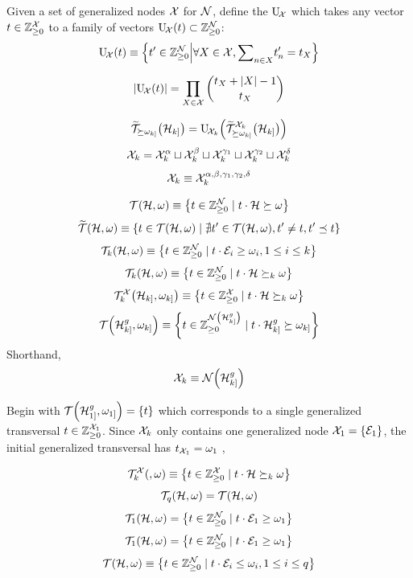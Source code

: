 \documentclass[aps, 10pt, english, twoside, twocolumn, pra, nofootinbib, tightenlines, longbibliography, superscriptaddress]{revtex4-1}
\begin{document}
    \begin{definition}
        Given a set of generalized nodes $\mathcal{X}$ for $\mathcal{N}$, define the  $\mathrm{U}_{\!\mathcal{X}}$ which takes any vector $t \in {\mathbb{Z}}_{\geq 0}^{\mathcal{X}}$ to a family of vectors $\mathrm{U}_{\!\s X}\br{t} \subset \Z_{\geq 0}^{\s N}$:
        \[ \mathrm{U}_{\!\s X}\br{t} \defined \bcm{t' \in \Z_{\geq 0}^{\s N}}{\forall X \in \s X, {\sum}_{n \in X} t'_{n} = t_{X}} \]
    \end{definition}
    \[ \abs{\mathrm{U}_{\!\s X}\br{t}} = \prod_{X \in \s X} \binom{t_{X} + \abs{X} - 1}{t_{X}} \]

    \[ \widetilde {\s T}_{\succeq \w_{k]}}\br{\s H_{k]}} = \mathrm{U}_{\!\s X_{k}}\br{\widetilde {\s T}_{\succeq \w_{k]}}^{\s X_{k}}\br{\s H_{k]}}} \]
    \[ \mathcal{X}_{k} = \mathcal{X}_{k}^{\alpha} \sqcup \mathcal{X}_{k}^{\beta} \sqcup \mathcal{X}_{k}^{\gamma_1} \sqcup \mathcal{X}_{k}^{\gamma_2} \sqcup \mathcal{X}_{k}^{\delta} \]
    \[ \mathcal{X}_{k} \equiv \mathcal{X}_{k}^{\alpha,\beta,\gamma_1,\gamma_2,\delta} \]
    \begin{definition}
        \[ \s T\br{\s H, \w} \defined \bc{t \in \Z_{\geq 0}^{\nodes} \mid t \cdot \s H \succeq \w} \]
        \[ \widetilde {\s T}\br{\s H, \w} \defined \bc{t \in \s T\br{\s H, \w} \mid \nexists t' \in \s T\br{\s H, \w}, t' \neq t, t' \preceq t} \]
        \[ \s T_{k}\br{\s H, \w} \defined \bc{t \in \Z_{\geq 0}^{\nodes} \mid t \cdot \edges_i \geq \w_i, 1 \leq i \leq k} \]
        \[ \s T_{k}\br{\s H, \w} \defined \bc{t \in \Z_{\geq 0}^{\nodes} \mid t \cdot \s H \succeq_{k} \w} \]
        \[ \s T_{k}^{\s X}\br{\s H_{k]}, \w_{k]}} \defined \bc{t \in \Z_{\geq 0}^{\s X} \mid t \cdot \s H \succeq_{k} \w} \]
        \[ \s T\br{\s H^{g}_{k]}, \w_{k]}} \defined \bc{t \in \Z_{\geq 0}^{\nodes\br{\s H_{k]}^{g}}} \mid t \cdot \s H^{g}_{k]} \succeq \w_{k]}} \]
        Shorthand,
        \[ \s X_k \defined \nodes\br{\s H_{k]}^{g}} \]

        Begin with $\s T\br{\s H^{g}_{1]}, \w_{1]}} = \bc{t}$ which corresponds to a single generalized transversal $t \in {\mathbb{Z}}_{\geq 0}^{\mathcal{X}_1}$. Since $\mathcal{X}_k$ only contains one generalized node $\s X_1 = \bc{\edges_1}$, the initial generalized transversal has $t_{\mathcal{X}_1} = \omega_1$ ,
        \[  \]

        \[ \s T_{k}^{\s X}\br{, \w} \defined \bc{t \in \Z_{\geq 0}^{\s X} \mid t \cdot \s H \succeq_{k} \w} \]
        \[ \s T_{q}\br{\s H, \w} = \s T\br{\s H, \w} \]
        \[ \s T_{1}\br{\s H, \w} = \bc{t \in \Z_{\geq 0}^{\nodes} \mid t \cdot \edges_1 \geq \w_1} \]
        \[ \s T_{1}\br{\s H, \w} = \bc{t \in \Z_{\geq 0}^{\nodes} \mid t \cdot \edges_1 \geq \w_1} \]
        \[ \s T\br{\s H, \w} \defined \bc{t \in \Z_{\geq 0}^{\nodes} \mid t \cdot \edges_i \leq \w_i, 1 \leq i \leq q} \]
    \end{definition}
\end{document}
